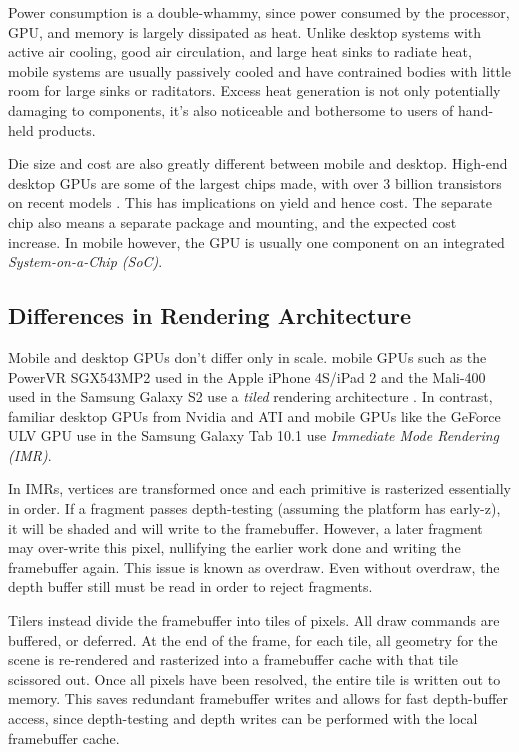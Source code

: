 Power consumption is a double-whammy, since power consumed by the processor, GPU, and memory is largely dissipated as heat.  Unlike desktop systems with active air cooling, good air circulation, and large heat sinks to radiate heat, mobile systems are usually passively cooled and have contrained bodies with little room for large sinks or raditators.  Excess heat generation is not only potentially damaging to components, it's also noticeable and bothersome to users of hand-held products.

Die size and cost are also greatly different between mobile and desktop.  High-end desktop GPUs are some of the largest chips made, with over 3 billion transistors on recent models \cite{Walton10}.  This has implications on yield and hence cost.  The separate chip also means a separate package and mounting, and the expected cost increase.  In mobile however, the GPU is usually one component on an integrated \textit{System-on-a-Chip (SoC)}.

\subsection{Differences in Rendering Architecture}\label{Jon-McCaffrey:differences-in-rendering-architecture}
Mobile and desktop GPUs don't differ only in scale.  mobile GPUs such as the PowerVR SGX543MP2 used in the Apple iPhone 4S/iPad 2 and the Mali-400 used in the Samsung Galaxy S2 use a \textit{tiled} rendering architecture \cite{anandtech_galaxys2}.  In contrast, familiar desktop GPUs from Nvidia and ATI and mobile GPUs like the GeForce ULV GPU use in the Samsung Galaxy Tab 10.1 use \textit{Immediate Mode Rendering (IMR)}.

In IMRs, vertices are transformed once and each primitive is rasterized essentially in order.  If a fragment passes depth-testing (assuming the platform has early-z), it will be shaded and will write to the framebuffer.  However, a later fragment may over-write this pixel, nullifying the earlier work done and writing the framebuffer again.  This issue is known as overdraw.  Even without overdraw, the depth buffer still must be read in order to reject fragments.

Tilers instead divide the framebuffer into tiles of pixels.  All draw commands are buffered, or deferred.  At the end of the frame, for each tile, all geometry for the scene is re-rendered and rasterized into a framebuffer cache with that tile scissored out.  Once all pixels have been resolved, the entire tile is written out to memory.  This saves redundant framebuffer writes and allows for fast depth-buffer access, since depth-testing and depth writes can be performed with the local framebuffer cache.

